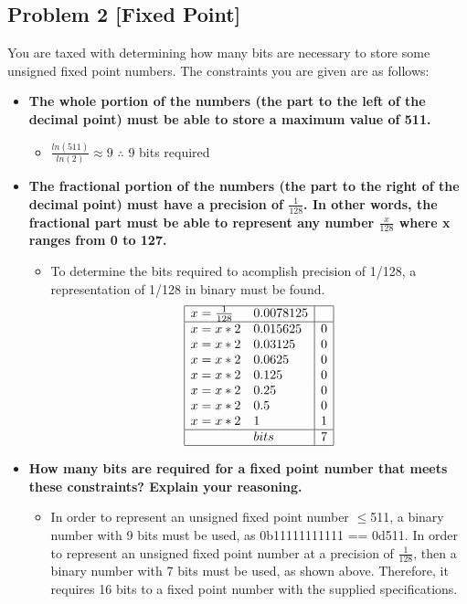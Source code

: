 \documentclass[11pt]{article}
\begin{document}
\subsection*{Problem 2 [Fixed Point]}
You are taxed with determining how many bits are necessary to store some unsigned fixed point numbers. The constraints you are given are as follows:
\begin{itemize}
	\item \textbf{The whole portion of the numbers (the part to the left of the decimal point) must be able to store a maximum value of 511.}
		\begin{itemize}
			\item $\frac{ln(511)}{ln(2)}\approx 9$
		$\therefore$ 9 bits required
		\end{itemize}
	\item \textbf{The fractional portion of the numbers (the part to the right of the decimal point) must have a precision of $\frac{1}{128}$. In other words, the fractional part must be able to represent any number $\frac{x}{128}$ where x ranges from 0 to 127.}
		\begin{itemize}
			\item To determine the bits required to acomplish precision of 1/128, a representation of 1/128 in binary must be found.
			\begin{align*}
				\begin{array}{ | l l | l |} \hline
					x = \frac{1}{128} & 0.0078125 & \\ \hline
					x = x * 2 & 0.015625 & 0 \\
					x = x * 2 & 0.03125 & 0 \\
					x = x * 2 & 0.0625 & 0 \\
					x = x * 2 & 0.125 & 0 \\
					x = x * 2 & 0.25 & 0 \\
					x = x * 2 & 0.5 & 0 \\
					x = x * 2 & 1 & 1 \\ \hline 
					& bits & \textup{7} \\ \hline
				\end{array}
			\end{align*}
		\end{itemize}
	\item \textbf{How many bits are required for a fixed point number that meets these constraints? Explain your reasoning.}
		\begin{itemize}
			\item In order to represent an unsigned fixed point number $\leq$511, a binary number with 9 bits must be used, as 0b11111111111 == 0d511. In order to represent an unsigned fixed point number at a precision of $\frac{1}{128}$, then a binary number with 7 bits must be used, as shown above. Therefore, it requires 16 bits to a fixed point number with the supplied specifications.
		\end{itemize}
\end{itemize}
\end{document}
